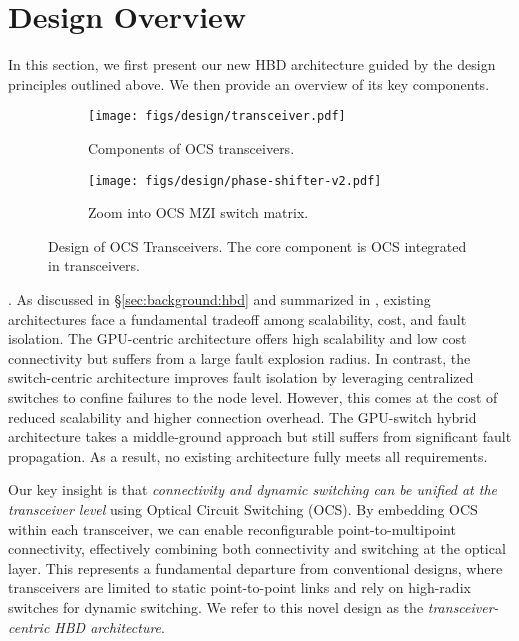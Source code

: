 

\section{Design Overview}
\label{sec:overview}

In this section, we first present our new HBD architecture \sys{} guided by the design principles outlined above. We then provide an overview of its key components.


\begin{figure*}[ht]
    \centering
    \begin{subfigure}[b]{0.45\textwidth}
        \centering
        \texttt{[image: figs/design/transceiver.pdf]}
        \caption{Components of OCS transceivers.}
        \label{figure:design:transceiver:component}
    \end{subfigure}
    \hspace{10pt}
    \begin{subfigure}[b]{0.45\textwidth}
        \centering
        \texttt{[image: figs/design/phase-shifter-v2.pdf]}
        \caption{Zoom into OCS MZI switch matrix.}
        \label{figure:design:transceiver:ocs}
    \end{subfigure}
    \vspace{-10pt}
    \caption{Design of OCS Transceivers. The core component is OCS integrated in transceivers.}
    \label{figure:design:transceiver}
    \vspace{-15pt}
\end{figure*}

.
As discussed in \S\ref{sec:background:hbd} and summarized in , existing architectures face a fundamental tradeoff among scalability, cost, and fault isolation. The GPU-centric architecture offers high scalability and low cost connectivity but suffers from a large fault explosion radius. In contrast, the switch-centric architecture improves fault isolation by leveraging centralized switches to confine failures to the node level. However, this comes at the cost of reduced scalability and higher connection overhead. The GPU-switch hybrid architecture takes a middle-ground approach but still suffers from significant fault propagation. As a result, no existing architecture fully meets all requirements.

Our key insight is that \textit{connectivity and dynamic switching can be unified at the transceiver level} using Optical Circuit Switching (OCS). By embedding OCS within each transceiver, we can enable reconfigurable point-to-multipoint connectivity, effectively combining both connectivity and switching at the optical layer. This represents a fundamental departure from conventional designs, where transceivers are limited to static point-to-point links and rely on high-radix switches for dynamic switching. We refer to this novel design as the \textit{transceiver-centric HBD architecture}. 

